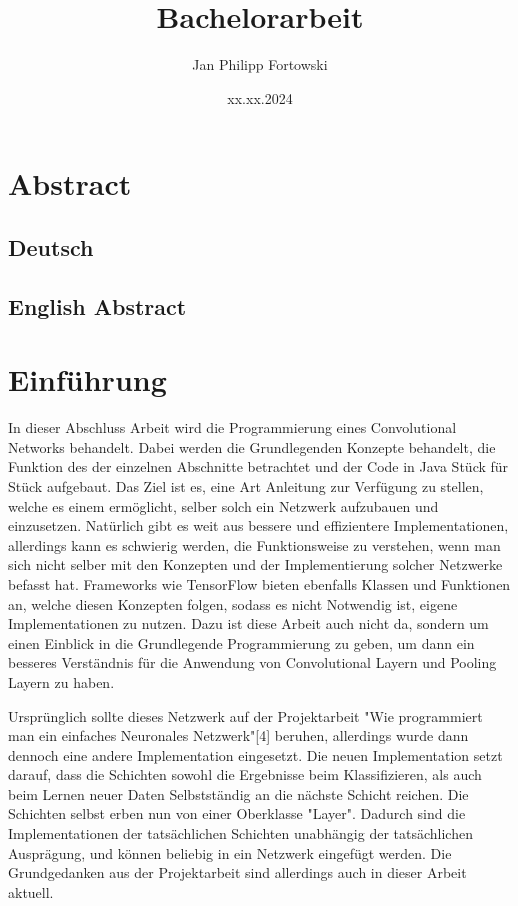 \documentclass[12pt]{article}
\title{\textbf{Bachelorarbeit}}
\author{Jan Philipp Fortowski}
\date{xx.xx.2024}
\begin{document}
\maketitle
\thispagestyle{empty}

\cleardoublepage
\thispagestyle{empty}
\section*{Abstract}
\subsection*{Deutsch}

\cleardoublepage
\thispagestyle{empty}
\subsection*{English Abstract}

\cleardoublepage
\tableofcontents
\thispagestyle{empty}
\cleardoublepage


\section{Einführung}
In dieser Abschluss Arbeit wird die Programmierung eines Convolutional Networks  behandelt. Dabei werden die Grundlegenden Konzepte behandelt, die Funktion des der einzelnen Abschnitte betrachtet und der Code in Java Stück für Stück aufgebaut. Das Ziel ist es, eine Art Anleitung zur Verfügung zu stellen, welche es einem ermöglicht, selber solch ein Netzwerk aufzubauen und einzusetzen. Natürlich gibt es weit aus bessere und effizientere Implementationen, allerdings kann es schwierig werden, die Funktionsweise zu verstehen, wenn man sich nicht selber mit den Konzepten und der Implementierung solcher Netzwerke befasst hat. Frameworks wie TensorFlow bieten ebenfalls Klassen und Funktionen an, welche diesen Konzepten folgen, sodass es nicht Notwendig ist, eigene Implementationen zu nutzen. Dazu ist diese Arbeit auch nicht da, sondern um einen Einblick in die Grundlegende Programmierung zu geben, um dann ein besseres Verständnis für die Anwendung von Convolutional Layern und Pooling Layern zu haben.

Ursprünglich sollte dieses Netzwerk auf der Projektarbeit "Wie programmiert man ein einfaches Neuronales Netzwerk"[4] beruhen, allerdings wurde dann dennoch eine andere Implementation eingesetzt. Die neuen Implementation setzt darauf, dass die Schichten sowohl die Ergebnisse beim Klassifizieren, als auch beim Lernen neuer Daten Selbstständig an die nächste Schicht reichen. Die Schichten selbst erben nun von einer Oberklasse "Layer". Dadurch sind die Implementationen der tatsächlichen Schichten unabhängig der tatsächlichen Ausprägung, und können beliebig in ein Netzwerk eingefügt werden. Die Grundgedanken aus der Projektarbeit sind allerdings auch in dieser Arbeit aktuell.
\end{document}
